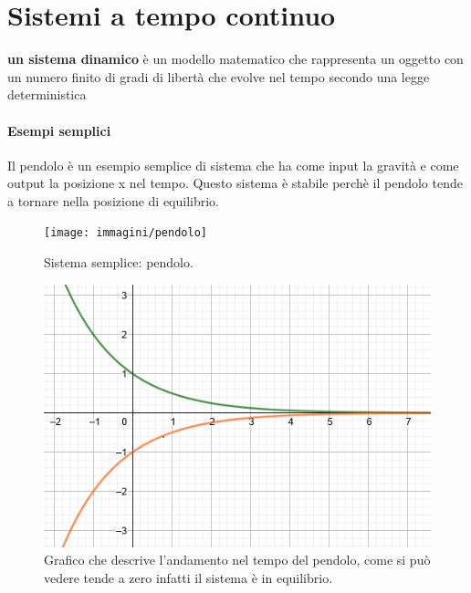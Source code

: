 
\chapter{Sistemi a tempo continuo}

	\begin{definizione}
		\textbf{un sistema dinamico} è un modello matematico che rappresenta un oggetto con un numero finito di gradi di libertà che evolve nel tempo secondo  una legge deterministica
	\end{definizione}
	\subsubsection{Esempi semplici}
		\begin{nexample}
			Il pendolo è un esempio semplice di sistema che ha come input la gravità e come output la posizione x nel tempo.
			Questo sistema è stabile perchè il pendolo tende a tornare nella posizione di equilibrio.
			
			\begin{figure}[H]
				\centering
				\texttt{[image: immagini/pendolo]}
				\caption{ Sistema semplice: pendolo. }
				\label{fig: pendolo}
			\end{figure}
			
			\begin{figure}[H]
				\centering
				\includegraphics[scale=0.5]{immagini/esp3}
				\caption{ Grafico che descrive l'andamento nel tempo del pendolo, come si può vedere tende a zero infatti il sistema è in equilibrio. }
				\label{fig: esp3}
			\end{figure}
			
		\end{nexample}

